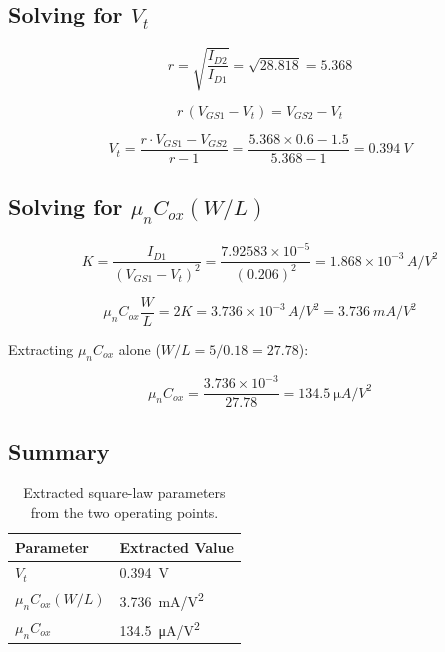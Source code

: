 \documentclass{article}
\begin{document}
\subsection{Solving for $V_t$}

\begin{equation}
r = \sqrt{\frac{I_{D2}}{I_{D1}}} = \sqrt{28.818} = 5.368
\end{equation}

\begin{equation}
r\,(V_{GS1} - V_t) = V_{GS2} - V_t
\end{equation}

\begin{equation}\label{eq:vt}
V_t = \frac{r \cdot V_{GS1} - V_{GS2}}{r - 1} = \frac{5.368 \times 0.6 - 1.5}{5.368 - 1} = \SI{0.394}{V}
\end{equation}

\subsection{Solving for $\mu_n C_{ox}(W/L)$}

\begin{equation}
K = \frac{I_{D1}}{(V_{GS1} - V_t)^2} = \frac{7.92583 \times 10^{-5}}{(0.206)^2} = 1.868 \times 10^{-3}\,\si{A/V^2}
\end{equation}

\begin{equation}\label{eq:mucox_wl}
\mu_n C_{ox}\frac{W}{L} = 2K = 3.736 \times 10^{-3}\,\si{A/V^2} = \SI{3.736}{mA/V^2}
\end{equation}

Extracting $\mu_n C_{ox}$ alone ($W/L = 5/0.18 = 27.78$):

\begin{equation}\label{eq:mucox}
\mu_n C_{ox} = \frac{3.736 \times 10^{-3}}{27.78} = \SI{134.5}{\micro A/V^2}
\end{equation}

\subsection{Summary}

\begin{table}[H]
\centering
\caption{Extracted square-law parameters from the two operating points.}
\label{tab:partB}
\begin{tabular}{@{}ll@{}}
\toprule
Parameter & Extracted Value \\
\midrule
$V_t$ & \SI{0.394}{V} \\
$\mu_n C_{ox}(W/L)$ & \SI{3.736}{mA/V^2} \\
$\mu_n C_{ox}$ & \SI{134.5}{\micro A/V^2} \\
\bottomrule
\end{tabular}
\end{table}
\end{document}
